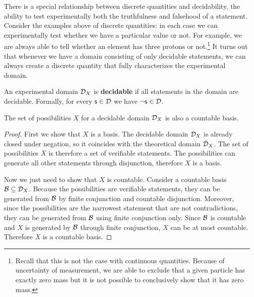 \documentclass[11pt,letterpaper,fleqn]{memoir} %
\begin{document}
There is a special relationship between discrete quantities and decidability, the ability to test experimentally both the truthfulness and falsehood of a statement. Consider the examples above of discrete quantities: in each case we can experimentally test whether we have a particular value or not. For example, we are always able to tell whether an element has three protons or not.\footnote{Recall that this is not the case with continuous quantities. Because of uncertainty of measurement, we are able to exclude that a given particle has exactly zero mass but it is not possible to conclusively show that it has zero mass.} It turns out that whenever we have a domain consisting of only decidable statements, we can always create a discrete quantity that fully characterizes the experimental domain.

\begin{mathSection}
	
	\begin{defn}
		An experimental domain $\mathcal{D}_X$ is \textbf{decidable} if all statements in the domain are decidable. Formally, for every $\mathsf{s} \in \mathcal{D}$ we have $\neg\mathsf{s} \in \mathcal{D}$.
	\end{defn}

	\begin{prop}
		The set of possibilities $X$ for a decidable domain $\mathcal{D}_X$ is also a countable basis.
	\end{prop}
	
	\begin{proof}
		First we show that $X$ is a basis. The decidable domain $\mathcal{D}_X$ is already closed under negation, so it coincides with the theoretical domain $\bar{\mathcal{D}}_X$. The set of possibilities $X$ is therefore a set of verifiable statements. The possibilities can generate all other statements through disjunction, therefore $X$ is a basis.
		
		Now we just need to show that $X$ is countable. Consider a countable basis $\mathcal{B} \subseteq \mathcal{D}_X$. Because the possibilities are verifiable statements, they can be generated from $\mathcal{B}$ by finite conjunction and countable disjunction. Moreover, since the possibilities are the narrowest statement that are not contradictions, they can be generated from $\mathcal{B}$ using finite conjunction only. Since $\mathcal{B}$ is countable and $X$ is generated by $\mathcal{B}$ through finite conjunction, $X$ can be at most countable. Therefore $X$ is a countable basis.
	\end{proof}
		

\end{mathSection}
\end{document}
